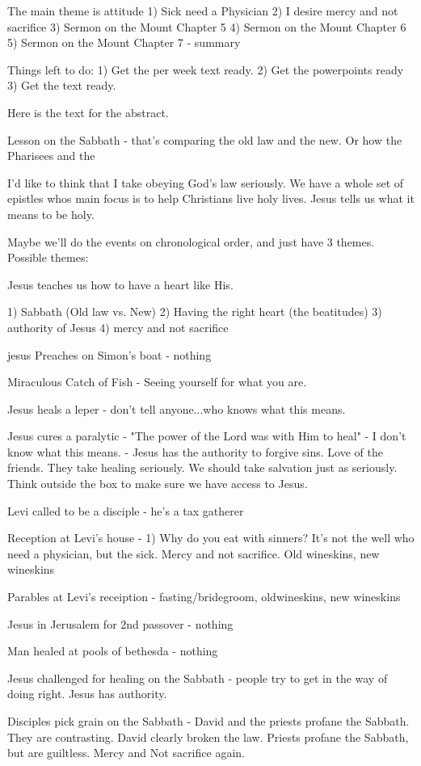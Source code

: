 The main theme is attitude
1) Sick need a Physician
2) I desire mercy and not sacrifice
3) Sermon on the Mount Chapter 5
4) Sermon on the Mount Chapter 6
5) Sermon on the Mount Chapter 7 - summary 

Things left to do:
1) Get the per week text ready.
2) Get the powerpoints ready
3) Get the text ready.


Here is the text for the abstract.

Lesson on the Sabbath - that's comparing the old law and the new.  Or how the Pharisees and the 

I'd like to think that I take obeying God's law seriously.  We have a whole set of epistles whos main focus is to help Christians live holy lives.  Jesus tells us what it means to be holy. 

Maybe we'll do the events on chronological order, and just have 3 themes.
Possible themes:

Jesus teaches us how to have a heart like His.

1) Sabbath (Old law vs. New)
2) Having the right heart (the beatitudes)
3) authority of Jesus
4) mercy and not sacrifice

jesus Preaches on Simon's boat - nothing

Miraculous Catch of Fish - Seeing yourself for what you are.

Jesus heals a leper - don't tell anyone...who knows what this means.

Jesus cures a paralytic - "The power of the Lord was with Him to heal" - I don't know what this means. - Jesus has the authority to forgive sins.  Love of the friends.  They take healing seriously.  We should take salvation just as seriously.  Think outside the box to make sure we have access to Jesus.

Levi called to be a disciple - he's a tax gatherer

Reception at Levi's house - 1) Why do you eat with sinners?  It's not the well who need a physician, but the sick.  Mercy and not sacrifice.  Old wineskins, new wineskins

Parables at Levi's receiption - fasting/bridegroom, oldwineskins, new wineskins

Jesus in Jerusalem for 2nd passover - nothing

Man healed at pools of bethesda - nothing

Jesus challenged for healing on the Sabbath - people try to get in the way of doing right.  Jesus has authority.

Disciples pick grain on the Sabbath - David and the priests profane the Sabbath.  They are contrasting.  David clearly broken the law.  Priests profane the Sabbath, but are guiltless. Mercy and Not sacrifice again.

